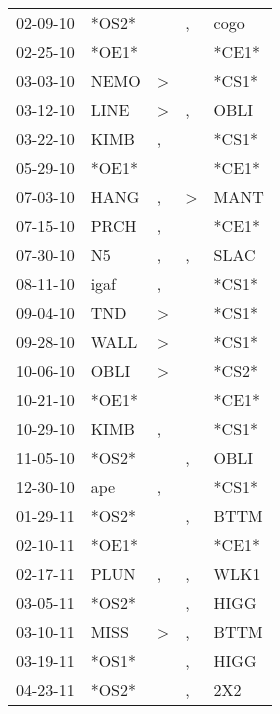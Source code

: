 \begin{supertabular}{lllll}
 02-09-10 &  *OS2* &                  &                , &   cogo \\
 02-25-10 &  *OE1* &                  &                  &  *CE1* \\
 03-03-10 &   NEMO &     \textgreater &                  &  *CS1* \\
 03-12-10 &   LINE &     \textgreater &                , &   OBLI \\
 03-22-10 &   KIMB &                , &                  &  *CS1* \\
 05-29-10 &  *OE1* &                  &                  &  *CE1* \\
 07-03-10 &   HANG &                , &     \textgreater &   MANT \\
 07-15-10 &   PRCH &                , &                  &  *CE1* \\
 07-30-10 &     N5 &                , &                , &   SLAC \\
 08-11-10 &   igaf &                , &                  &  *CS1* \\
 09-04-10 &    TND &     \textgreater &                  &  *CS1* \\
 09-28-10 &   WALL &     \textgreater &                  &  *CS1* \\
 10-06-10 &   OBLI &     \textgreater &                  &  *CS2* \\
 10-21-10 &  *OE1* &                  &                  &  *CE1* \\
 10-29-10 &   KIMB &                , &                  &  *CS1* \\
 11-05-10 &  *OS2* &                  &                , &   OBLI \\
 12-30-10 &    ape &                , &                  &  *CS1* \\
 01-29-11 &  *OS2* &                  &                , &   BTTM \\
 02-10-11 &  *OE1* &                  &                  &  *CE1* \\
 02-17-11 &   PLUN &                , &                , &   WLK1 \\
 03-05-11 &  *OS2* &                  &                , &   HIGG \\
 03-10-11 &   MISS &     \textgreater &                , &   BTTM \\
 03-19-11 &  *OS1* &                  &                , &   HIGG \\
 04-23-11 &  *OS2* &                  &                , &    2X2 \\

\end{supertabular}
